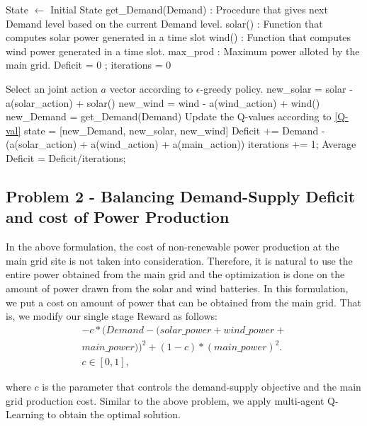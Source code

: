 \documentclass[conference]{IEEEtran}
\begin{document}
\begin{algorithm}
\caption{}
\label{q-learning}
\begin{algorithmic}[1]
	\State  State $\leftarrow$ Initial State 
    \State get\_Demand(Demand) : Procedure that gives next Demand level based on the current Demand level.
   \State solar() : Function that computes solar power generated in a time slot
    \State wind() : Function that computes wind power generated in a time slot.
    \State max\_prod : Maximum power alloted by the main grid.
    \State Deficit = 0 ; iterations = 0
     
     \State Select an joint action $a$ vector according to $\epsilon$-greedy policy.
     \State new\_solar = solar - a(solar\_action) + solar()
     \State new\_wind = wind - a(wind\_action) + wind()
     \State new\_Demand = get\_Demand(Demand)
     \State Update the Q-values according to \eqref{Q-val}
     \State state = [new\_Demand, new\_solar, new\_wind]
     \State Deficit += Demand - (a(solar\_action) + a(wind\_action) + a(main\_action))
     \State iterations += 1;
    \EndProcedure
    \State Average Deficit = Deficit/iterations;
\end{algorithmic}
\end{algorithm}


\subsection{Problem 2 - Balancing Demand-Supply Deficit and cost of Power Production}
In the above formulation, the cost of non-renewable power production at the main grid site is not taken into consideration. Therefore, it is natural to use the entire power obtained from the main grid and the optimization is done on the amount of power drawn from the solar and wind batteries. In this formulation, we put a cost on amount of power that can be obtained from the main grid. That is, we modify our single stage Reward as follows:
\begin{equation}\label{prob2}
\begin{split}
 -c*(Demand - (solar\_power + wind\_power+ \\
 main\_power))^2+(1-c)*(main\_power)^2.\\
 c \in[0,1],
 \end{split}
\end{equation}


where $c$ is the parameter that controls the demand-supply objective and the main grid production cost. 
Similar to the above problem, we apply multi-agent Q-Learning to obtain the optimal solution. 
\end{document}
